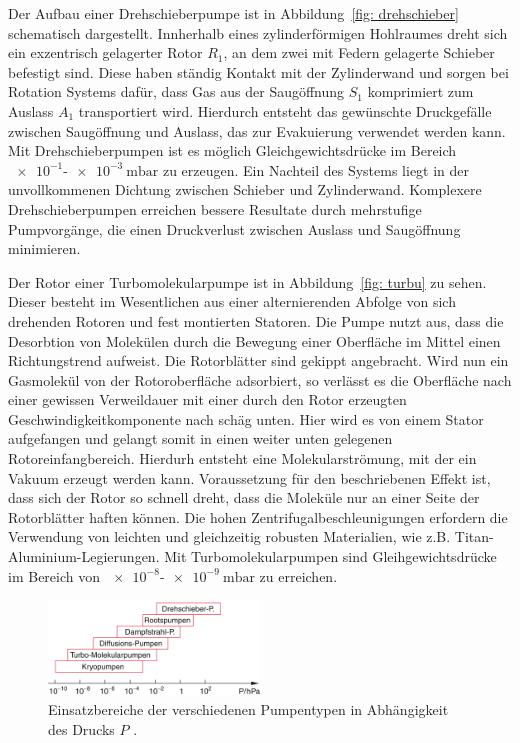 Der Aufbau einer Drehschieberpumpe ist in Abbildung~\ref{fig: drehschieber} schematisch dargestellt. Innherhalb
eines zylinderförmigen Hohlraumes dreht sich ein exzentrisch gelagerter Rotor $R_1$, an dem zwei mit Federn gelagerte
Schieber befestigt sind. Diese haben ständig Kontakt mit der Zylinderwand und sorgen bei Rotation Systems dafür, dass
Gas aus der Saugöffnung $S_1$ komprimiert zum Auslass $A_1$ transportiert wird. Hierdurch entsteht das gewünschte
Druckgefälle zwischen Saugöffnung und Auslass, das zur Evakuierung verwendet werden kann. Mit Drehschieberpumpen
ist es möglich Gleichgewichtsdrücke im Bereich $\num{e-1}$-$\SI{e-3}{\milli\bar}$ zu erzeugen. Ein Nachteil des
Systems liegt in der unvollkommenen Dichtung zwischen Schieber und Zylinderwand. Komplexere Drehschieberpumpen
erreichen bessere Resultate durch mehrstufige Pumpvorgänge, die einen Druckverlust
zwischen Auslass und Saugöffnung minimieren.

Der Rotor einer Turbomolekularpumpe ist in Abbildung~\ref{fig: turbu} zu sehen. Dieser besteht im Wesentlichen aus einer
alternierenden Abfolge von sich drehenden Rotoren und fest montierten Statoren. Die Pumpe nutzt aus, dass die
Desorbtion von Molekülen durch die Bewegung einer Oberfläche im Mittel einen Richtungstrend aufweist. Die Rotorblätter
sind gekippt angebracht. Wird nun ein Gasmolekül von der Rotoroberfläche adsorbiert, so verlässt es die Oberfläche
nach einer gewissen Verweildauer mit einer durch den Rotor erzeugten Geschwindigkeitkomponente nach schäg unten. Hier
wird es von einem Stator aufgefangen und gelangt somit in einen weiter unten gelegenen Rotoreinfangbereich.
Hierdurh entsteht eine Molekularströmung, mit der ein Vakuum erzeugt werden kann. Voraussetzung für den beschriebenen
Effekt ist, dass sich der Rotor so schnell dreht, dass die Moleküle nur an einer Seite der Rotorblätter haften können.
Die hohen Zentrifugalbeschleunigungen erfordern die Verwendung von leichten und gleichzeitig robusten Materialien, wie z.B.
Titan-Aluminium-Legierungen. Mit Turbomolekularpumpen sind Gleihgewichtsdrücke im Bereich von $\num{e-8}$-$\SI{e-9}{\milli\bar}$
zu erreichen.

\begin{figure}
  \centering
  \includegraphics[width = 0.5\textwidth]{theorie_plots/einsatzbereich_pumpen.png}
  \caption{Einsatzbereiche der verschiedenen Pumpentypen in Abhängigkeit des Drucks $P$ \cite{dem1}.}
  \label{fig: einordnung_pumpen}
\end{figure}


